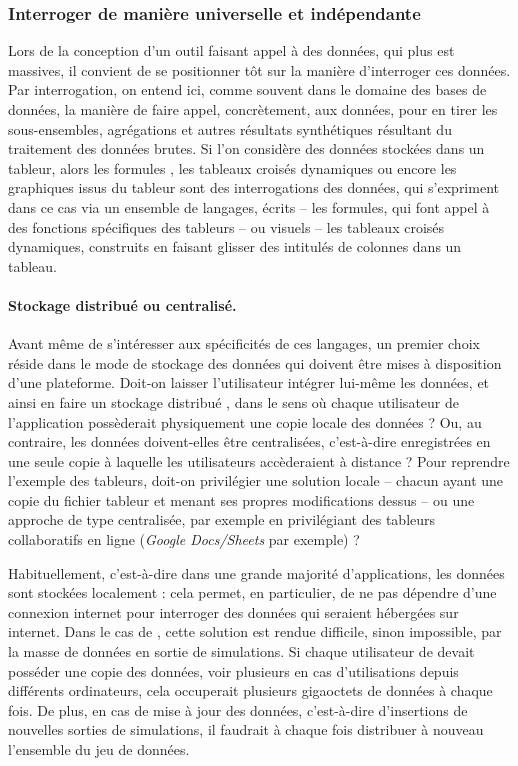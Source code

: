 \subsubsection{Interroger de manière universelle et indépendante}

Lors de la conception d'un outil faisant appel à des données, qui plus est massives, il convient de se positionner tôt sur la manière d'interroger ces données.
Par interrogation, on entend ici, comme souvent dans le domaine des bases de données, la manière de faire appel, concrètement, aux données, pour en tirer les sous-ensembles, agrégations et autres résultats synthétiques résultant du traitement des données brutes.
Si l'on considère des données stockées dans un tableur, alors les \og formules \fg{}, les tableaux croisés dynamiques ou encore les graphiques issus du tableur sont des interrogations des données, qui s'expriment dans ce cas via un ensemble de langages, écrits -- les formules, qui font appel à des fonctions spécifiques des tableurs -- ou visuels -- les tableaux croisés dynamiques, construits en faisant glisser des intitulés de colonnes dans un tableau.

\paragraph{Stockage distribué ou centralisé.}\label{par:stockage-centralise}
Avant même de s'intéresser aux spécificités de ces langages, un premier choix réside dans le mode de stockage des données qui doivent être mises à disposition d'une plateforme.
Doit-on laisser l'utilisateur intégrer lui-même les données, et ainsi en faire un stockage \og distribué \fg{}, dans le sens où chaque utilisateur de l'application possèderait physiquement une copie locale des données ?
Ou, au contraire, les données doivent-elles être centralisées, c'est-à-dire enregistrées en une seule copie à laquelle les utilisateurs accèderaient à distance ?
Pour reprendre l'exemple des tableurs, doit-on privilégier une solution locale -- chacun ayant une copie du fichier tableur et menant ses propres modifications dessus -- ou une approche de type centralisée, par exemple en privilégiant des tableurs collaboratifs en ligne (\textit{Google Docs/Sheets} par exemple) ?

Habituellement, c'est-à-dire dans une grande majorité d'applications, les données sont stockées localement : cela permet, en particulier, de ne pas dépendre d'une connexion internet pour interroger des données qui seraient hébergées sur internet.
Dans le cas de \simfeodal{}, cette solution est rendue difficile, sinon impossible, par la masse de données en sortie de simulations.
Si chaque utilisateur de \simedb{} devait posséder une copie des données, voir plusieurs en cas d'utilisations depuis différents ordinateurs, cela occuperait plusieurs gigaoctets de données à chaque fois.
De plus, en cas de mise à jour des données, c'est-à-dire d'insertions de nouvelles sorties de simulations, il faudrait à chaque fois distribuer à nouveau l'ensemble du jeu de données.

